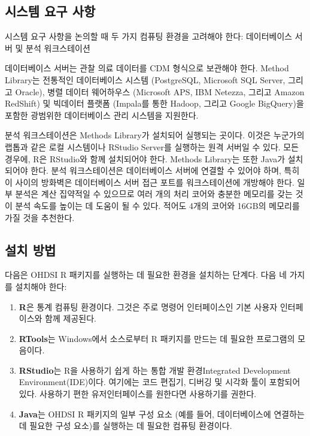 \documentclass[10.5pt]{book}
\providecommand{\tightlist}{%
  \setlength{\itemsep}{0pt}\setlength{\parskip}{0pt}}
\theoremstyle{definition}
\theoremstyle{definition}
\theoremstyle{definition}
\theoremstyle{remark}
\begin{document}
\subsection{시스템 요구 사항}\label{--}

시스템 요구 사항을 논의할 때 두 가지 컴퓨팅 환경을 고려해야 한다:
데이터베이스 서버 및 분석 워크스테이션 

데이터베이스 서버는 관찰 의료 데이터를 CDM 형식으로 보관해야 한다.
Method Library는 전통적인 데이터베이스 시스템 (PostgreSQL, Microsoft SQL
Server, 그리고 Oracle), 병렬 데이터 웨어하우스 (Microsoft APS, IBM
Netezza, 그리고 Amazon RedShift) 및 빅데이터 플랫폼 (Impala를 통한
Hadoop, 그리고 Google BigQuery)을 포함한 광범위한 데이터베이스 관리
시스템을 지원한다.

분석 워크스테이션은 Methods Library가 설치되어 실행되는 곳이다. 이것은
누군가의 랩톱과 같은 로컬 시스템이나 RStudio Server를 실행하는 원격
서버일 수 있다. 모든 경우에, R은 RStudio와 함께 설치되어야 한다. Methods
Library는 또한 Java가 설치되어야 한다. 분석 워크스테이션은 데이터베이스
서버에 연결할 수 있어야 하며, 특히 이 사이의 방화벽은 데이터베이스 서버
접근 포트를 워크스테이션에 개방해야 한다. 일부 분석은 계산 집약적일 수
있으므로 여러 개의 처리 코어와 충분한 메모리를 갖는 것이 분석 속도를
높이는 데 도움이 될 수 있다. 적어도 4개의 코어와 16GB의 메모리를 가질
것을 추천한다.

\subsection{설치 방법}\label{installR}

다음은 OHDSI R 패키지를 실행하는 데 필요한 환경을 설치하는 단계다. 다음
네 가지를 설치해야 한다: 

\begin{enumerate}
\def\labelenumi{\arabic{enumi}.}
\tightlist
\item
  \textbf{R}은 통계 컴퓨팅 환경이다. 그것은 주로 명령어 인터페이스인
  기본 사용자 인터페이스와 함께 제공된다.
\item
  \textbf{RTools}는 Windows에서 소스로부터 R 패키지를 만드는 데 필요한
  프로그램의 모음이다.
\item
  \textbf{RStudio}는 R을 사용하기 쉽게 하는 통합 개발 환경Integrated
  Development Environment(IDE)이다. 여기에는 코드 편집기, 디버깅 및
  시각화 툴이 포함되어 있다. 사용하기 편한 유저인터페이스를 원한다면
  사용하기를 권한다.
\item
  \textbf{Java}는 OHDSI R 패키지의 일부 구성 요소 (예를 들어,
  데이터베이스에 연결하는 데 필요한 구성 요소)를 실행하는 데 필요한
  컴퓨팅 환경이다.
\end{enumerate}
\end{document}
